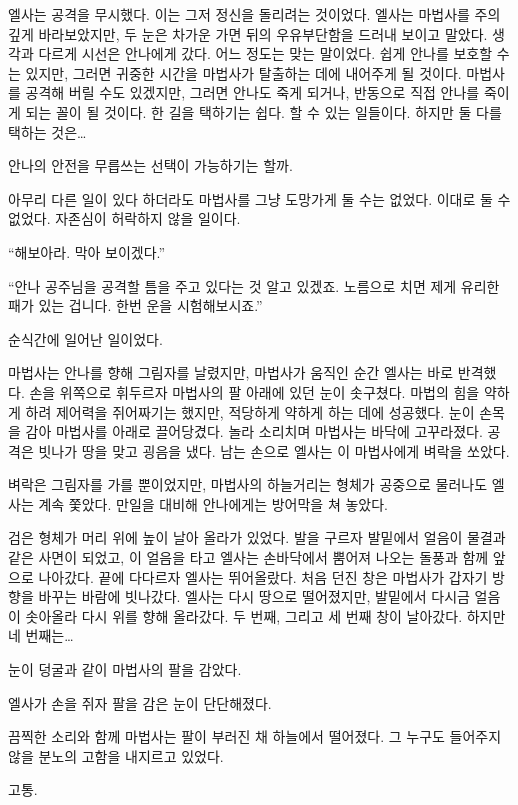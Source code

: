 엘사는 공격을 무시했다. 이는 그저 정신을 돌리려는 것이었다. 엘사는 마법사를 주의 깊게 바라보았지만, 두 눈은 차가운 가면 뒤의 우유부단함을 드러내 보이고 말았다. 생각과 다르게 시선은 안나에게 갔다. 어느 정도는 맞는 말이었다. 쉽게 안나를 보호할 수는 있지만, 그러면 귀중한 시간을 마법사가 탈출하는 데에 내어주게 될 것이다. 마법사를 공격해 버릴 수도 있겠지만, 그러면 안나도 죽게 되거나, 반동으로 직접 안나를 죽이게 되는 꼴이 될 것이다. 한 길을 택하기는 쉽다. 할 수 있는 일들이다. 하지만 둘 다를 택하는 것은\ldots

안나의 안전을 무릅쓰는 선택이 가능하기는 할까.

아무리 다른 일이 있다 하더라도 마법사를 그냥 도망가게 둘 수는 없었다. 이대로 둘 수 없었다. 자존심이 허락하지 않을 일이다.

``해보아라. 막아 보이겠다.''

``안나 공주님을 공격할 틈을 주고 있다는 것 알고 있겠죠. 노름으로 치면 제게 유리한 패가 있는 겁니다. 한번 운을 시험해보시죠.''

순식간에 일어난 일이었다.

마법사는 안나를 향해 그림자를 날렸지만, 마법사가 움직인 순간 엘사는 바로 반격했다. 손을 위쪽으로 휘두르자 마법사의 팔 아래에 있던 눈이 솟구쳤다. 마법의 힘을 약하게 하려 제어력을 쥐어짜기는 했지만, 적당하게 약하게 하는 데에 성공했다. 눈이 손목을 감아 마법사를 아래로 끌어당겼다. 놀라 소리치며 마법사는 바닥에 고꾸라졌다. 공격은 빗나가 땅을 맞고 굉음을 냈다. 남는 손으로 엘사는 이 마법사에게 벼락을 쏘았다.

벼락은 그림자를 가를 뿐이었지만, 마법사의 하늘거리는 형체가 공중으로 물러나도 엘사는 계속 쫓았다. 만일을 대비해 안나에게는 방어막을 쳐 놓았다.

검은 형체가 머리 위에 높이 날아 올라가 있었다. 발을 구르자 발밑에서 얼음이 물결과 같은 사면이 되었고, 이 얼음을 타고 엘사는 손바닥에서 뿜어져 나오는 돌풍과 함께 앞으로 나아갔다. 끝에 다다르자 엘사는 뛰어올랐다. 처음 던진 창은 마법사가 갑자기 방향을 바꾸는 바람에 빗나갔다. 엘사는 다시 땅으로 떨어졌지만, 발밑에서 다시금 얼음이 솟아올라 다시 위를 향해 올라갔다. 두 번째, 그리고 세 번째 창이 날아갔다. 하지만 네 번째는\ldots

눈이 덩굴과 같이 마법사의 팔을 감았다.

엘사가 손을 쥐자 팔을 감은 눈이 단단해졌다.

끔찍한 소리와 함께 마법사는 팔이 부러진 채 하늘에서 떨어졌다. 그 누구도 들어주지 않을 분노의 고함을 내지르고 있었다.

\textbreak

고통.

